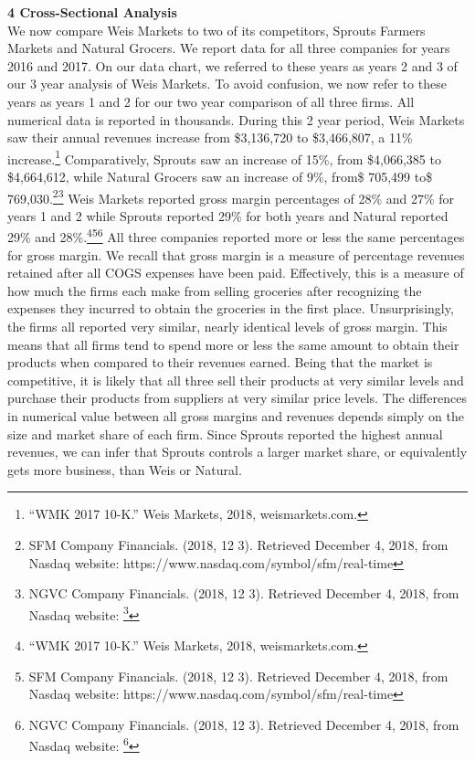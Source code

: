 \documentclass[12pt]{article}
\begin{document}
\begin{doublespacing}
\textbf{4 Cross-Sectional Analysis}
\\
We now compare Weis Markets to two of its competitors, Sprouts Farmers Markets and Natural Grocers. We report data for all three companies for years 2016 and 2017. On our data chart, we referred to these years as years 2 and 3 of our 3 year analysis of Weis Markets. To avoid confusion, we now refer to these years as years 1 and 2 for our two year comparison of all three firms. All numerical data is reported in thousands. During this 2 year period, Weis Markets saw their annual revenues increase from \$3,136,720 to \$3,466,807, a 11\% increase.\footnote{“WMK 2017 10-K.” Weis Markets, 2018, weismarkets.com.} Comparatively, Sprouts saw an increase of 15\%, from \$4,066,385 to \$4,664,612, while Natural Grocers saw an increase of 9\%, from\$ 705,499 to\$ 769,030.\footnote{SFM Company Financials. (2018, 12 3). Retrieved December 4, 2018, from Nasdaq website: 
     https://www.nasdaq.com/symbol/sfm/real-time }\footnote{NGVC Company Financials. (2018, 12 3). Retrieved December 4, 2018, from Nasdaq website: 
     \footnote{SFM Company Financials. (2018, 12 3). Retrieved December 4, 2018, from Nasdaq 
     website: https://www.nasdaq.com/symbol/sfm/real-time } } Weis Markets reported gross margin percentages of 28\% and 27\% for years 1 and 2 while Sprouts reported 29\% for both years and Natural reported 29\% and 28\%.\footnote{“WMK 2017 10-K.” Weis Markets, 2018, weismarkets.com.}\footnote{SFM Company Financials. (2018, 12 3). Retrieved December 4, 2018, from Nasdaq website: 
     https://www.nasdaq.com/symbol/sfm/real-time }\footnote{NGVC Company Financials. (2018, 12 3). Retrieved December 4, 2018, from Nasdaq website: 
     \footnote{SFM Company Financials. (2018, 12 3). Retrieved December 4, 2018, from Nasdaq 
     website: https://www.nasdaq.com/symbol/sfm/real-time } } All three companies reported more or less the same percentages for gross margin. We recall that gross margin is a measure of percentage revenues retained after all COGS expenses have been paid. Effectively, this is a measure of how much the firms each make from selling groceries after recognizing the expenses they incurred to obtain the groceries in the first place. Unsurprisingly, the firms all reported very similar, nearly identical levels of gross margin. This means that all firms tend to spend more or less the same amount to obtain their products when compared to their revenues earned. Being that the market is competitive, it is likely that all three sell their products at very similar levels and purchase their products from suppliers at very similar price levels. The differences in numerical value between all gross margins and revenues depends simply on the size and market share of each firm. Since Sprouts reported the highest annual revenues, we can infer that Sprouts controls a larger market share, or equivalently gets more business, than Weis or Natural. 


\end{doublespacing}
\end{document}
